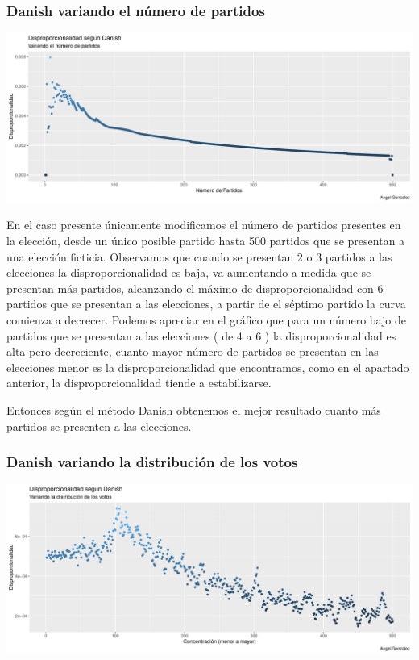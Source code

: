\documentclass[12pt,a4paper,]{book}
\numberwithin{dummy}{section}
\theoremstyle{ocrenumbox}
\theoremstyle{blacknumex}
\theoremstyle{blacknumbox}
\theoremstyle{ocrenum}
\theoremstyle{ocrenum}
\begin{document}
\hypertarget{danish-variando-el-nuxfamero-de-partidos}{%
\subsubsection{Danish variando el número de
partidos}\label{danish-variando-el-nuxfamero-de-partidos}}

\begin{center}\includegraphics[width=0.95\linewidth]{figurasR/unnamed-chunk-40-1} \end{center}

En el caso presente únicamente modificamos el número de partidos
presentes en la elección, desde un único posible partido hasta 500
partidos que se presentan a una elección ficticia. Observamos que cuando
se presentan 2 o 3 partidos a las elecciones la disproporcionalidad es
baja, va aumentando a medida que se presentan más partidos, alcanzando
el máximo de disproporcionalidad con 6 partidos que se presentan a las
elecciones, a partir de el séptimo partido la curva comienza a decrecer.
Podemos apreciar en el gráfico que para un número bajo de partidos que
se presentan a las elecciones ( de 4 a 6 ) la disproporcionalidad es
alta pero decreciente, cuanto mayor número de partidos se presentan en
las elecciones menor es la disproporcionalidad que encontramos, como en
el apartado anterior, la disproporcionalidad tiende a estabilizarse.

Entonces según el método Danish obtenemos el mejor resultado cuanto más
partidos se presenten a las elecciones.

\hypertarget{danish-variando-la-distribuciuxf3n-de-los-votos}{%
\subsubsection{Danish variando la distribución de los
votos}\label{danish-variando-la-distribuciuxf3n-de-los-votos}}

\begin{center}\includegraphics[width=0.95\linewidth]{figurasR/unnamed-chunk-41-1} \end{center}
\end{document}
